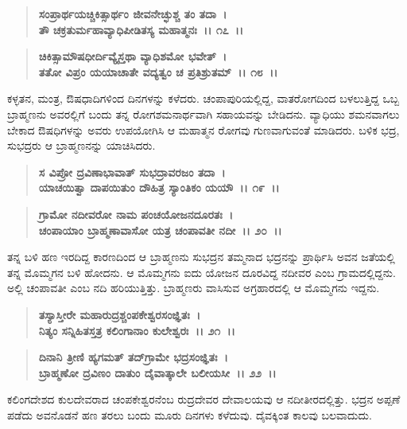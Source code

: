 \begin{verse}
\textbf{ಸಂಪ್ರಾರ್ಥಯಚ್ಚಿಕಿತ್ಸಾರ್ಥಂ ಜೀವನೇಚ್ಛುಶ್ಚ ತಂ ತದಾ~।}\\\textbf{ತೌ ಚಕ್ರತುರ್ಮಹಾವ್ಯಾಧಿಪೀಡಿತಸ್ಯ ಮಹಾತ್ಮನಃ~।। ೧೭~।।}
\end{verse}

\begin{verse}
\textbf{ಚಿಕಿತ್ಸಾಮೌಷಧೀರ್ದಿವ್ಯೈಸ್ತಥಾ ವ್ಯಾಧಿಶಮೋ ಭವೇತ್~।}\\\textbf{ತತೋ ವಿಪ್ರಂ ಯಯಾಚಾತೇ ವದ್ಯತ್ವಂ ಚ ಪ್ರತಿಶ್ರುತಮ್~।। ೧೮~।।}
\end{verse}

ಕಳ್ಳತನ, ಮಂತ್ರ, ಔಷಧಾದಿಗಳಿಂದ ದಿನಗಳನ್ನು ಕಳೆದರು. ಚಂಪಾಪುರಿಯಲ್ಲಿದ್ದ, ವಾತರೋಗದಿಂದ ಬಳಲುತ್ತಿದ್ದ ಒಬ್ಬ ಬ್ರಾಹ್ಮಣನು ಅವರಲ್ಲಿಗೆ ಬಂದು ತನ್ನ ರೋಗಶಮನಾರ್ಥವಾಗಿ ಸಹಾಯವನ್ನು ಬೇಡಿದನು. ವ್ಯಾಧಿಯು ಶಮನವಾಗಲು ಬೇಕಾದ ಔಷಧಿಗಳನ್ನು ಅವರು ಉಪಯೋಗಿಸಿ ಆ ಮಹಾತ್ಮನ ರೋಗವು ಗುಣವಾಗುವಂತೆ ಮಾಡಿದರು. ಬಳಿಕ ಭದ್ರ, ಸುಭದ್ರರು ಆ ಬ್ರಾಹ್ಮಣನನ್ನು ಯಾಚಿಸಿದರು.

\begin{verse}
\textbf{ಸ ವಿಪ್ರೋ ದ್ರವಿಣಾಭಾವಾತ್ ಸುಭದ್ರಾವರಜಂ ತದಾ~।}\\\textbf{ಯಾಚಯಿತ್ವಾ ದಾಪಯಿತುಂ ದೌಹಿತ್ರ ಸ್ಯಾಂತಿಕಂ ಯಯೌ~।। ೧೯~।। }
\end{verse}

\begin{verse}
\textbf{ಗ್ರಾಮೋ ನದೀವರೋ ನಾಮ ಪಂಚಯೋಜನದೂರತಃ~।}\\\textbf{ಚಂಪಾಯಾಂ ಬ್ರಾಹ್ಮಣಾವಾಸೋ ಯತ್ರ ಚಂಪಾವತೀ ನದೀ~।। ೨೦~।।}
\end{verse}

ತನ್ನ ಬಳಿ ಹಣ ಇರದಿದ್ದ ಕಾರಣದಿಂದ ಆ ಬ್ರಾಹ್ಮಣನು ಸುಭದ್ರನ ತಮ್ಮನಾದ ಭದ್ರನನ್ನು ಪ್ರಾರ್ಥಿಸಿ ಅವನ ಜತೆಯಲ್ಲಿ ತನ್ನ ಮೊಮ್ಮಗನ ಬಳಿ ಹೋದನು. ಆ ಮೊಮ್ಮಗನು ಐದು ಯೋಜನ ದೂರವಿದ್ದ ನದೀವರ ಎಂಬ ಗ್ರಾಮದಲ್ಲಿದ್ದನು. ಅಲ್ಲಿ ಚಂಪಾವತೀ ಎಂಬ ನದಿ ಹರಿಯುತ್ತಿತ್ತು. ಬ್ರಾಹ್ಮಣರು ವಾಸಿಸುವ ಅಗ್ರಹಾರದಲ್ಲಿ ಆ ಮೊಮ್ಮಗನು ಇದ್ದನು.

\begin{verse}
\textbf{ತಸ್ಯಾಸ್ತೀರೇ ಮಹಾರುದ್ರಶ್ಚಂಪಕೇಶ್ವರಸಂಜ್ಞಿತಃ~।}\\\textbf{ನಿತ್ಯಂ ಸನ್ನಿಹಿತಸ್ತತ್ರ ಕಲಿಂಗಾನಾಂ ಕುಲೇಶ್ವರಃ~।। ೨೧~।। }
\end{verse}

\begin{verse}
\textbf{ದಿನಾನಿ ತ್ರೀಣಿ ಹ್ಯಗಮತ್ ತದ್‌ಗ್ರಾಮೇ ಭದ್ರಸಂಜ್ಞಿತಃ~।}\\\textbf{ಬ್ರಾಹ್ಮಣೋ ದ್ರವಿಣಂ ದಾತುಂ ದೈವಾತ್ಕಾಲೇ ಬಲೀಯಸೀ~।। ೨೨~।।}
\end{verse}

ಕಲಿಂಗದೇಶದ ಕುಲದೇವರಾದ ಚಂಪಕೇಶ್ವರನೆಂಬ ರುದ್ರದೇವರ ದೇವಾಲಯವು ಆ ನದೀತೀರದಲ್ಲಿತ್ತು. ಭದ್ರನ ಅಪ್ಪಣೆ ಪಡೆದು ಅವನೊಡನೆ ಹಣ ತರಲು ಬಂದು ಮೂರು ದಿನಗಳು ಕಳೆದುವು. ದೈವಕ್ಕಿಂತ ಕಾಲವು ಬಲವಾದುದು.

